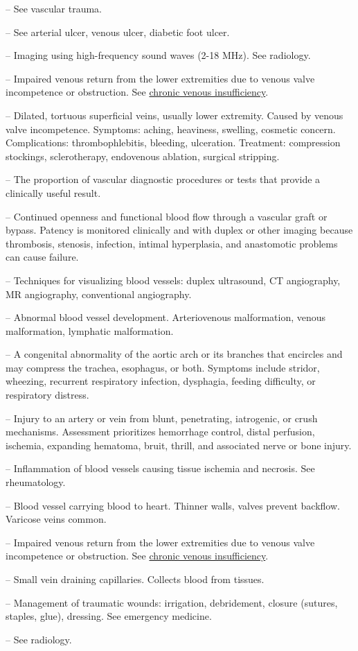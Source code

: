 -- See vascular trauma.

-- See arterial ulcer, venous ulcer, diabetic foot ulcer.

-- Imaging using high-frequency sound waves (2-18 MHz). See radiology.


-- Impaired venous return from the lower extremities due to venous valve incompetence or obstruction. See \hyperlink{Chronic Venous Insufficiency}{chronic venous insufficiency}.

-- Dilated, tortuous superficial veins, usually lower extremity. Caused by venous valve incompetence. Symptoms: aching, heaviness, swelling, cosmetic concern. Complications: thrombophlebitis, bleeding, ulceration. Treatment: compression stockings, sclerotherapy, endovenous ablation, surgical stripping.

-- The proportion of vascular diagnostic procedures or tests that provide a clinically useful result.

-- Continued openness and functional blood flow through a vascular graft or bypass. Patency is monitored clinically and with duplex or other imaging because thrombosis, stenosis, infection, intimal hyperplasia, and anastomotic problems can cause failure.

-- Techniques for visualizing blood vessels: duplex ultrasound, CT angiography, MR angiography, conventional angiography.

-- Abnormal blood vessel development. Arteriovenous malformation, venous malformation, lymphatic malformation.

-- A congenital abnormality of the aortic arch or its branches that encircles and may compress the trachea, esophagus, or both. Symptoms include stridor, wheezing, recurrent respiratory infection, dysphagia, feeding difficulty, or respiratory distress.

-- Injury to an artery or vein from blunt, penetrating, iatrogenic, or crush mechanisms. Assessment prioritizes hemorrhage control, distal perfusion, ischemia, expanding hematoma, bruit, thrill, and associated nerve or bone injury.

-- Inflammation of blood vessels causing tissue ischemia and necrosis. See rheumatology.

-- Blood vessel carrying blood to heart. Thinner walls, valves prevent backflow. Varicose veins common.

-- Impaired venous return from the lower extremities due to venous valve incompetence or obstruction. See \hyperlink{Chronic Venous Insufficiency}{chronic venous insufficiency}.

-- Small vein draining capillaries. Collects blood from tissues.

-- Management of traumatic wounds: irrigation, debridement, closure (sutures, staples, glue), dressing. See emergency medicine.

-- See radiology.
